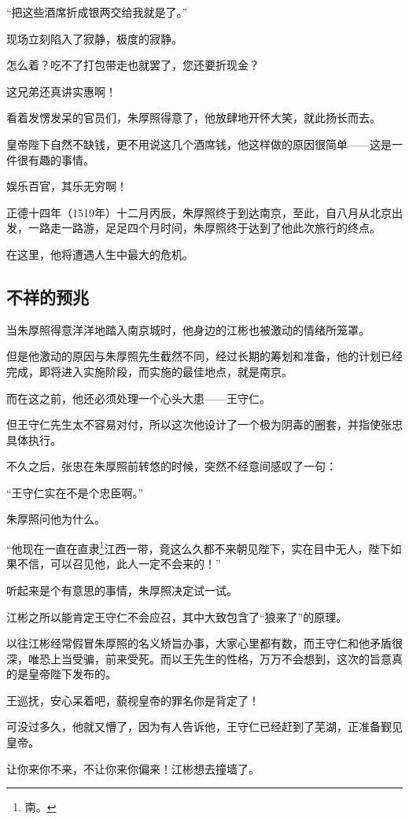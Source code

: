 \begin{multicols}{\theparacolNo}
		“把这些酒席折成银两交给我就是了。”

		现场立刻陷入了寂静，极度的寂静。

		怎么着？吃不了打包带走也就罢了，您还要折现金？

		这兄弟还真讲实惠啊！

		看着发愣发呆的官员们，朱厚照得意了，他放肆地开怀大笑，就此扬长而去。

		皇帝陛下自然不缺钱，更不用说这几个酒席钱，他这样做的原因很简单——这是一件很有趣的事情。

		娱乐百官，其乐无穷啊！

		正德十四年（1519年）十二月丙辰，朱厚照终于到达南京，至此，自八月从北京出发，一路走一路游，足足四个月时间，朱厚照终于达到了他此次旅行的终点。

		在这里，他将遭遇人生中最大的危机。

		\subsection{不祥的预兆}
		当朱厚照得意洋洋地踏入南京城时，他身边的江彬也被激动的情绪所笼罩。

		但是他激动的原因与朱厚照先生截然不同，经过长期的筹划和准备，他的计划已经完成，即将进入实施阶段，而实施的最佳地点，就是南京。

		而在这之前，他还必须处理一个心头大患——王守仁。

		但王守仁先生太不容易对付，所以这次他设计了一个极为阴毒的圈套，并指使张忠具体执行。

		不久之后，张忠在朱厚照前转悠的时候，突然不经意间感叹了一句：

		“王守仁实在不是个忠臣啊。”

		朱厚照问他为什么。

		“他现在一直在直隶\footnote{南。}江西一带，竟这么久都不来朝见陛下，实在目中无人，陛下如果不信，可以召见他，此人一定不会来的！”

		听起来是个有意思的事情，朱厚照决定试一试。

		江彬之所以能肯定王守仁不会应召，其中大致包含了“狼来了”的原理。

		以往江彬经常假冒朱厚照的名义矫旨办事，大家心里都有数，而王守仁和他矛盾很深，唯恐上当受骗，前来受死。而以王先生的性格，万万不会想到，这次的旨意真的是皇帝陛下发布的。

		王巡抚，安心呆着吧，藐视皇帝的罪名你是背定了！

		可没过多久，他就又懵了，因为有人告诉他，王守仁已经赶到了芜湖，正准备觐见皇帝。

		让你来你不来，不让你来你偏来！江彬想去撞墙了。


\end{multicols}
